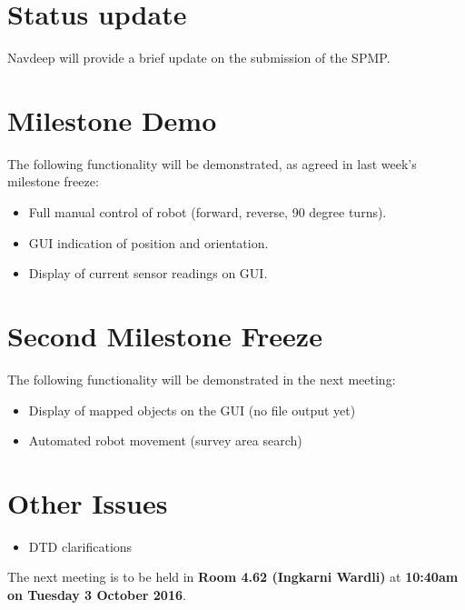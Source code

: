 \documentclass[11pt, a4paper]{article}
\begin{document}


\section{Status update}

Navdeep will provide a brief update on the submission of the SPMP.

\section{Milestone Demo}

The following functionality will be demonstrated, as agreed in last week's milestone freeze:
\begin{itemize}
\item Full manual control of robot (forward, reverse, 90 degree turns).
\item GUI indication of position and orientation.
\item Display of current sensor readings on
GUI.
\end{itemize}

\section{Second Milestone Freeze}
The following functionality will be demonstrated in the next meeting:
\begin{itemize}
\item Display of mapped objects on the GUI (no file output yet)
\item Automated robot movement (survey area search)
\end{itemize}

\section{Other Issues}

\begin{itemize}
\item DTD clarifications
\end{itemize}



\vspace*{10pt}

\noindent The next meeting is to be held in {\bf Room 4.62 (Ingkarni Wardli)} at {\bf 10:40am on Tuesday 3 October 2016}.
\end{document}
